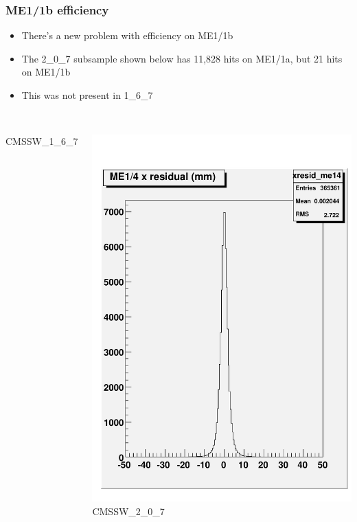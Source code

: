 \documentclass[compress]{beamer}
\begin{document}
\begin{frame}
\frametitle{ME1/1b efficiency}
\small

\begin{itemize}
\item There's a new problem with efficiency on ME1/1b
\item The 2\_0\_7 subsample shown below has 11,828 hits on ME1/1a, but 21 hits on ME1/1b
\item This was not present in 1\_6\_7
\end{itemize}

\begin{columns}
\mbox{ } \hfill CMSSW\_1\_6\_7

\mbox{ } \hfill \includegraphics[width=0.7\linewidth]{talk_me14_xresid_167.pdf}
CMSSW\_2\_0\_7


\end{columns}
\end{frame}
\end{document}
